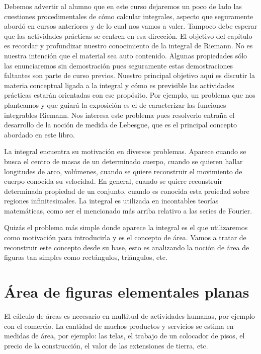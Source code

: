 Debemos advertir  al alumno que en este curso dejaremos un poco de lado las cuestiones procedimentales de cómo calcular integrales, aspecto que seguramente abordó en cursos anteriores y de lo cual nos vamos a valer. Tampoco debe esperar que las actividades prácticas se centren en esa dirección. El objetivo del capítulo es recordar y profundizar nuestro conocimiento de la integral de Riemann. No es nuestra intención que el material sea auto contenido. Algunas propiedades sólo las enunciaremos sin demostración pues seguramente estas demostraciones faltantes son parte de curso previos.   Nuestro principal objetivo aquí es discutir la materia conceptual ligada a la integral y cómo es previsible las actividades prácticas estarán orientadas con ese propósito. Por ejemplo, un problema que nos planteamos y que guiará la exposición es el de caracterizar las funciones integrables Riemann. Nos interesa este problema pues  resolverlo entraña el desarrollo de la noción de medida de  Lebesgue, que es el principal concepto abordado en este libro.


La integral encuentra su motivación en diversos problemas. Aparece cuando se busca el centro de masas de un determinado cuerpo, cuando se quieren hallar longitudes de arco, volúmenes, cuando se quiere reconstruir el movimiento de cuerpo conocida su velocidad. En general, cuando se quiere reconstruir determinada propiedad de un conjunto, cuando es conocida esta proiedad sobre regiones infinitesimales.  La integral es utilizada en incontables teorías matemáticas, como ser el mencionado más arriba relativo a las series de Fourier. 

Quizás el 
problema más simple donde aparece la integral es el que utilizaremos como motivación para introducirla y es el concepto de área.  Vamos a tratar de reconstruir este concepto desde su base, esto es analizando la noción de área de figuras tan simples como rectángulos, triángulos, etc. 



\section{Área de figuras elementales planas}\label{sec:area_elem}

  
El cálculo de áreas es necesario en multitud de actividades humanas, por ejemplo con el comercio. La cantidad de muchos productos y servicios se estima en medidas de área, por ejemplo: las telas,  el trabajo de un colocador de pisos,  el precio de la construcción,  el valor de las extensiones de tierra, etc.  
 
